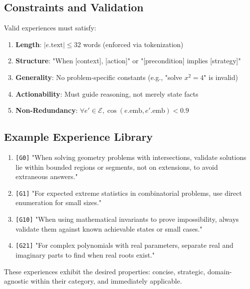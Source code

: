 \subsection{Constraints and Validation}

Valid experiences must satisfy:

\begin{enumerate}
    \item \textbf{Length}: $|e.\text{text}| \leq 32$ words (enforced via tokenization)
    \item \textbf{Structure}: "When [context], [action]" or "[precondition] implies [strategy]"
    \item \textbf{Generality}: No problem-specific constants (e.g., "solve $x^2 = 4$" is invalid)
    \item \textbf{Actionability}: Must guide reasoning, not merely state facts
    \item \textbf{Non-Redundancy}: $\forall e' \in \mathcal{E}, \cos(e.\text{emb}, e'.\text{emb}) < 0.9$
\end{enumerate}

\subsection{Example Experience Library}

\begin{example}
\begin{enumerate}
    \item \texttt{[G0]} "When solving geometry problems with intersections, validate solutions lie within bounded regions or segments, not on extensions, to avoid extraneous answers."
    
    \item \texttt{[G1]} "For expected extreme statistics in combinatorial problems, use direct enumeration for small sizes."
    
    \item \texttt{[G10]} "When using mathematical invariants to prove impossibility, always validate them against known achievable states or small cases."
    
    \item \texttt{[G21]} "For complex polynomials with real parameters, separate real and imaginary parts to find when real roots exist."
\end{enumerate}
\end{example}

These experiences exhibit the desired properties: concise, strategic, domain-agnostic within their category, and immediately applicable.


